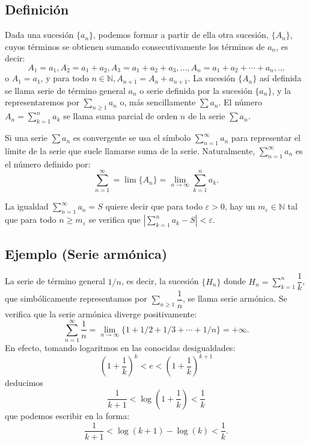 \documentclass[10pt,a4paper]{article}
\begin{document}
	\subsection{Definición}
	
	Dada una sucesión $\{a_n\}$, podemos formar a partir de ella otra sucesión, $\{A_n\}$, cuyos términos se obtienen sumando consecutivamente los términos de ${a_n}$, es decir:
	$$A_1 = a_1, A_2 = a_1 + a_2, A_3 = a_1 + a_2 + a_3, \dots, A_n = a_1 + a_2 + \cdots + a_n, \dots$$
	o $A_1 = a_1$, y para todo $n \in \mathbb{N}, A_{n+1} = A_n + a_{n+1}$. La sucesión $\{A_n\}$ así definida se llama serie de término general $a_n$ o serie definida por la sucesión $\{a_n\}$, y la representaremos por $\displaystyle \sum_{n \geq 1} a_n$ o, más sencillamente $\sum a_n$. El número $A_n = \displaystyle \sum_{k = 1}^n a_k$ se llama suma parcial de orden $n$ de la serie $\sum a_n$. 
	
	Si una serie $\sum a_n$ es convergente se usa el símbolo $\displaystyle \sum_{n = 1} ^ \infty a_n$ para representar el límite de la serie que suele llamarse suma de la serie. Naturalmente, $\displaystyle \sum_{n = 1} ^\infty a_n$ es el número definido por:
	$$ \sum_{n = 1}^\infty = \lim\{A_n\} = \lim_{n \rightarrow \infty} \sum_{k = 1} ^n a_k.$$
	
	La igualdad $\displaystyle\sum_{n = 1} ^\infty a_n = S$ quiere decir que para todo $\varepsilon > 0$, hay un $m_\varepsilon \in \mathbb{N}$ tal que para todo $n \geq m_\varepsilon$ se verifica que $\displaystyle \left|\sum_{k = 1} ^n a_k - S \right| < \varepsilon$.
	
	\subsection{Ejemplo (Serie armónica)}
	
	La serie de término general $1/n$, es decir, la sucesión $\{H_n\}$ donde $H_n = \sum_{k = 1}^n \dfrac{1}{k}$, que simbólicamente representamos por $\sum_{n \geq 1} \dfrac{1}{n}$, se llama serie armónica. Se verifica que la serie armónica diverge positivamente:
	$$ \sum_{n = 1}^\infty \dfrac{1}{n} = \lim_{n \rightarrow \infty}
	\{1 + 1/2 + 1/3 + \cdots + 1/n\} = + \infty.$$
	En efecto, tomando logaritmos en las conocidas desigualdades: 
	$$\left(1 + \dfrac{1}{k}\right) ^k < e < \left(1 + \dfrac{1}{k}\right) ^{k+1}$$ 
	deducimos
	$$ \dfrac{1}{k+1} < \log\left(1 + \dfrac{1}{k}\right) < \dfrac{1}{k}$$
	que podemos escribir en la forma:
	$$\dfrac{1}{k+1} < \log(k+1) - \log(k) < \dfrac{1}{k}.$$
	
\end{document}
